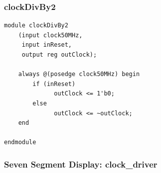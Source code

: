 \documentclass[a4paper]{article}
\begin{document}
\subsubsection{clockDivBy2}

\begin{Verbatim}
module clockDivBy2
	(input clock50MHz,
	 input inReset,
	 output reg outClock);

	always @(posedge clock50MHz) begin
		if (inReset)
			  outClock <= 1'b0;
		else
			  outClock <= ~outClock;
	end

endmodule
\end{Verbatim}

\subsubsection{Seven Segment Display: clock_driver}
\end{document}

